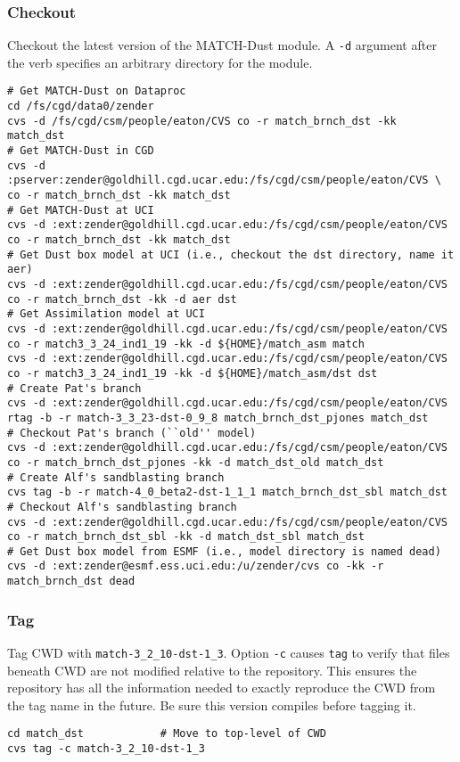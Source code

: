 \documentclass[12pt,twoside]{article}
\begin{document}
\subsubsection[Checkout]{Checkout}
Checkout the latest version of the MATCH-Dust module. 
A \verb'-d' argument after the verb specifies an arbitrary directory
for the module.
\begin{verbatim}
# Get MATCH-Dust on Dataproc
cd /fs/cgd/data0/zender
cvs -d /fs/cgd/csm/people/eaton/CVS co -r match_brnch_dst -kk match_dst
# Get MATCH-Dust in CGD
cvs -d :pserver:zender@goldhill.cgd.ucar.edu:/fs/cgd/csm/people/eaton/CVS \
co -r match_brnch_dst -kk match_dst 
# Get MATCH-Dust at UCI
cvs -d :ext:zender@goldhill.cgd.ucar.edu:/fs/cgd/csm/people/eaton/CVS co -r match_brnch_dst -kk match_dst 
# Get Dust box model at UCI (i.e., checkout the dst directory, name it aer)
cvs -d :ext:zender@goldhill.cgd.ucar.edu:/fs/cgd/csm/people/eaton/CVS co -r match_brnch_dst -kk -d aer dst
# Get Assimilation model at UCI
cvs -d :ext:zender@goldhill.cgd.ucar.edu:/fs/cgd/csm/people/eaton/CVS co -r match3_3_24_ind1_19 -kk -d ${HOME}/match_asm match
cvs -d :ext:zender@goldhill.cgd.ucar.edu:/fs/cgd/csm/people/eaton/CVS co -r match3_3_24_ind1_19 -kk -d ${HOME}/match_asm/dst dst
# Create Pat's branch
cvs -d :ext:zender@goldhill.cgd.ucar.edu:/fs/cgd/csm/people/eaton/CVS rtag -b -r match-3_3_23-dst-0_9_8 match_brnch_dst_pjones match_dst
# Checkout Pat's branch (``old'' model)
cvs -d :ext:zender@goldhill.cgd.ucar.edu:/fs/cgd/csm/people/eaton/CVS co -r match_brnch_dst_pjones -kk -d match_dst_old match_dst 
# Create Alf's sandblasting branch
cvs tag -b -r match-4_0_beta2-dst-1_1_1 match_brnch_dst_sbl match_dst
# Checkout Alf's sandblasting branch
cvs -d :ext:zender@goldhill.cgd.ucar.edu:/fs/cgd/csm/people/eaton/CVS co -r match_brnch_dst_sbl -kk -d match_dst_sbl match_dst 
# Get Dust box model from ESMF (i.e., model directory is named dead)
cvs -d :ext:zender@esmf.ess.uci.edu:/u/zender/cvs co -kk -r match_brnch_dst dead
\end{verbatim}

\subsubsection[Tag]{Tag}
Tag CWD with \verb'match-3_2_10-dst-1_3'.
Option \verb'-c' causes \verb'tag' to verify that files beneath CWD
are not modified relative to the repository. 
This ensures the repository has all the information needed to exactly
reproduce the CWD from the tag name in the future.
Be sure this version compiles before tagging it.
\begin{verbatim}
cd match_dst            # Move to top-level of CWD
cvs tag -c match-3_2_10-dst-1_3
\end{verbatim}
\end{document}

